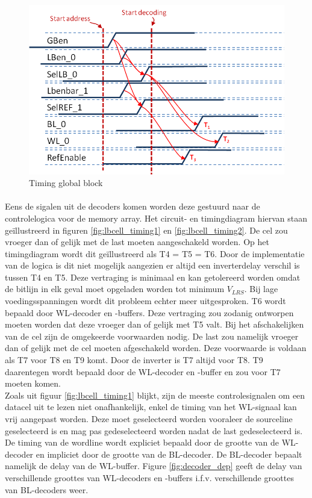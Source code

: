 \begin{figure}[!ht]
  \centering
  \includegraphics[scale=0.9]{../fig/hfdstk-timing-gb2.png}
  \caption[Global block:timing]{Timing global block}
  \label{fig:gb_timing2}
\end{figure}

\paragraph{}
Eens de sigalen uit de decoders komen worden deze gestuurd naar de controlelogica voor de memory array. Het circuit- en timingdiagram hiervan staan geïllustreerd in figuren \ref{fig:lbcell_timing1} en \ref{fig:lbcell_timing2}. De cel zou vroeger dan of gelijk met de last moeten aangeschakeld worden. Op het timingdiagram wordt dit geïllustreerd als T4 = T5 = T6. Door de implementatie van de logica is dit niet mogelijk aangezien er altijd een inverterdelay verschil is tussen T4 en T5. Deze vertraging is minimaal en kan getolereerd worden omdat de bitlijn in elk geval moet opgeladen worden tot minimum $V_{LRS}$. Bij lage voedingsspanningen wordt dit probleem echter meer uitgesproken. T6 wordt bepaald door WL-decoder en -buffers. Deze vertraging zou zodanig ontworpen moeten worden dat deze vroeger dan of gelijk met T5 valt. Bij het afschakelijken van de cel zijn de omgekeerde voorwaarden nodig. De last zou namelijk vroeger dan of gelijk met de cel moeten afgeschakeld worden. Deze voorwaarde is voldaan als T7 voor T8 en T9 komt. Door de inverter is T7 altijd voor T8. T9 daarentegen wordt bepaald door de WL-decoder en -buffer en zou voor T7 moeten komen. \\
Zoals uit figuur \ref{fig:lbcell_timing1} blijkt, zijn de meeste controlesignalen om een datacel uit te lezen niet onafhankelijk, enkel de timing van het WL-signaal kan vrij aangepast worden. Deze moet geselecteerd worden vooraleer de sourceline geselecteerd is en mag pas gedeselecteerd worden nadat de last gedeselecteerd is. \\
De timing van de wordline wordt expliciet bepaald door de grootte van de WL-decoder en impliciet door de grootte van de BL-decoder. De BL-decoder bepaalt namelijk de delay van de WL-buffer. Figure \ref{fig:decoder_dep} geeft de delay van verschillende groottes van WL-decoders en -buffers i.f.v. verschillende groottes van BL-decoders weer.

